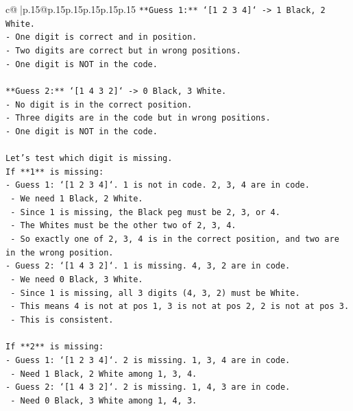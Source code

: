\documentclass{article}
\begin{document}
{\begin{supertabular}{c@{$\;$}|p{.15\linewidth}@{}p{.15\linewidth}p{.15\linewidth}p{.15\linewidth}p{.15\linewidth}p{.15\linewidth}}
{{{\texttt{**Guess 1:** `{[}1 2 3 4{]}` {-}> 1 Black, 2 White.} \\
\texttt{{-} One digit is correct and in position.} \\
\texttt{{-} Two digits are correct but in wrong positions.} \\
\texttt{{-} One digit is NOT in the code.} \\
\\ 
\texttt{**Guess 2:** `{[}1 4 3 2{]}` {-}> 0 Black, 3 White.} \\
\texttt{{-} No digit is in the correct position.} \\
\texttt{{-} Three digits are in the code but in wrong positions.} \\
\texttt{{-} One digit is NOT in the code.} \\
\\ 
\texttt{Let's test which digit is missing.} \\
\texttt{If **1** is missing:} \\
\texttt{{-} Guess 1: `{[}1 2 3 4{]}`. 1 is not in code. 2, 3, 4 are in code.} \\
\texttt{  {-} We need 1 Black, 2 White.} \\
\texttt{  {-} Since 1 is missing, the Black peg must be 2, 3, or 4.} \\
\texttt{  {-} The Whites must be the other two of 2, 3, 4.} \\
\texttt{  {-} So exactly one of 2, 3, 4 is in the correct position, and two are in the wrong position.} \\
\texttt{{-} Guess 2: `{[}1 4 3 2{]}`. 1 is missing. 4, 3, 2 are in code.} \\
\texttt{  {-} We need 0 Black, 3 White.} \\
\texttt{  {-} Since 1 is missing, all 3 digits (4, 3, 2) must be White.} \\
\texttt{  {-} This means 4 is not at pos 1, 3 is not at pos 2, 2 is not at pos 3.} \\
\texttt{  {-} This is consistent.} \\
\\ 
\texttt{If **2** is missing:} \\
\texttt{{-} Guess 1: `{[}1 2 3 4{]}`. 2 is missing. 1, 3, 4 are in code.} \\
\texttt{  {-} Need 1 Black, 2 White among 1, 3, 4.} \\
\texttt{{-} Guess 2: `{[}1 4 3 2{]}`. 2 is missing. 1, 4, 3 are in code.} \\
\texttt{  {-} Need 0 Black, 3 White among 1, 4, 3.} \\
}}}
\end{supertabular}}
\end{document}
